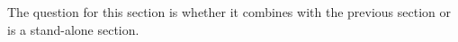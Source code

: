 
The question for this section is whether it combines with the previous section or is a stand-alone section.

